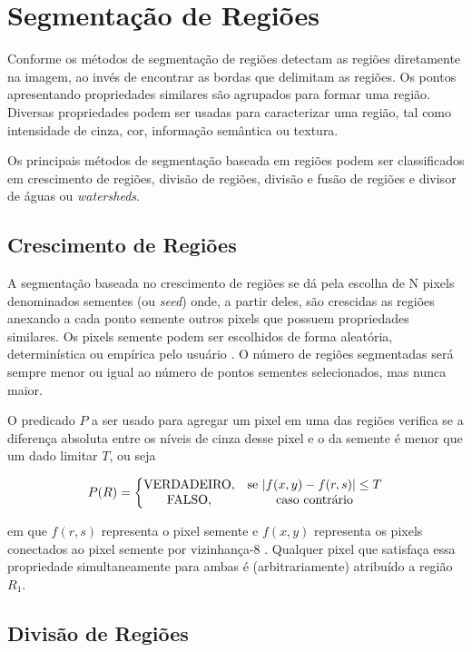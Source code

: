 \documentclass[12pt,oneside,a4paper,english,french,spanish,brazil,]{abntex2}
\begin{document}
\section{Segmentação de Regiões}
Conforme \citet{pedrini:2008} os métodos de segmentação de regiões detectam as regiões diretamente na imagem, ao invés de encontrar as bordas que delimitam as regiões. Os pontos apresentando propriedades similares são agrupados para formar uma região. Diversas propriedades podem ser usadas para caracterizar uma região, tal como intensidade de cinza, cor, informação semântica ou textura.

Os principais métodos de segmentação baseada em regiões podem ser classificados em crescimento de regiões, divisão de regiões, divisão e fusão de regiões e divisor de águas ou \textit{watersheds}.

\subsection{Crescimento de Regiões}

A segmentação baseada no crescimento de regiões se dá pela escolha de N pixels denominados sementes (ou \textit{seed}) onde, a partir deles, são crescidas as regiões anexando a cada ponto semente outros pixels que possuem propriedades similares. Os pixels semente podem ser escolhidos de forma aleatória, determinística ou empírica pelo usuário \cite{pedrini:2008}. O número de regiões segmentadas será sempre menor ou igual ao número de pontos sementes selecionados, mas nunca maior.

O predicado \(P\) a ser usado para agregar um pixel em uma das regiões verifica se a diferença absoluta entre os níveis de cinza desse pixel e o da semente é menor que um dado limitar \(T\), ou seja

\[P(R) = \left\{\begin{matrix}
\textup{VERDADEIRO}, & \textup{se }|f(x,y) - f(r,s)| \leq T\\ 
\textup{FALSO}, & \textup{caso contrário}
\end{matrix}\right.\]

em que \(f(r,s)\) representa o pixel semente e \(f(x,y)\) representa os pixels conectados ao pixel semente por vizinhança-8 \cite{pedrini:2008}. Qualquer pixel que satisfaça essa propriedade simultaneamente para ambas é (arbitrariamente) atribuído a região \(R_1\). 

\subsection{Divisão de Regiões}
\end{document}
